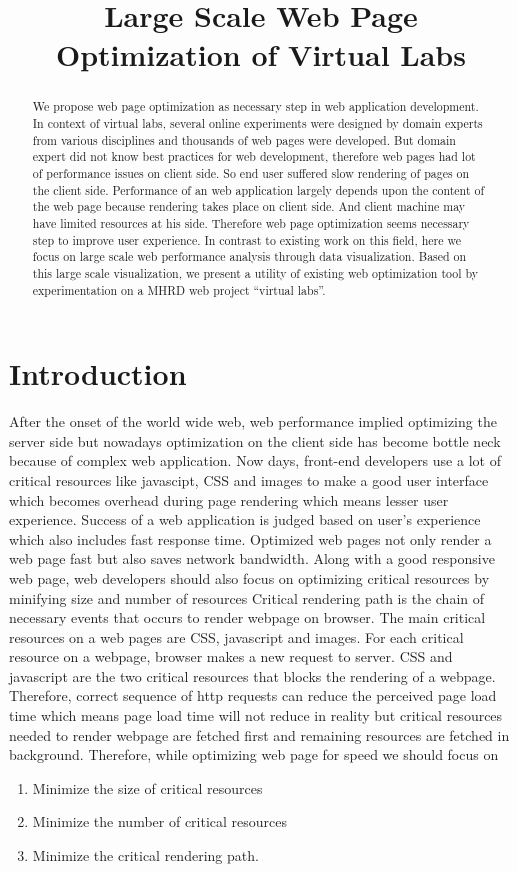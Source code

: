 \documentclass[conference]{IEEEtran}
\title{Large Scale Web Page Optimization of Virtual Labs}
\begin{document}
\maketitle

\begin{abstract}
We propose web page optimization as necessary step in web application
development. In context of virtual labs, several online experiments were designed by domain
experts from various disciplines and thousands of web pages were developed.
But domain expert did not know best practices for web development, therefore
web pages had lot of performance issues on client side. So end user suffered slow
rendering of pages on the client side.
Performance of an web application largely depends upon the content of the web
page because rendering takes place on client side. 
And client machine may have limited resources at his side. Therefore web page
optimization seems necessary step to improve user experience.
In contrast to existing work on this field, here we focus on large scale web
performance analysis through data visualization. Based on this large scale visualization,
we present a utility of existing web optimization tool by experimentation on a
MHRD web project ``virtual labs''.
\end{abstract}

\section{Introduction}\label{sec-2}
After the onset of the world wide web, web performance implied optimizing the server side but nowadays
optimization on the client side has become bottle neck because of complex web
application. Now days, front-end developers use a lot of critical resources like
javascipt, CSS and images to make a good user interface which becomes
overhead during page rendering which means lesser user experience. Success of a web
application is judged based on user's experience which also includes fast response
time. Optimized web pages not only render a web page fast but also saves network
bandwidth. Along with a good responsive web page, web developers should
also focus on optimizing critical resources by minifying size and number of resources
Critical rendering path is the chain of necessary events that
occurs to render webpage on browser. The main critical resources on a web
pages are CSS, javascript and images. For each critical resource on a
webpage, browser makes a new request to server. CSS and javascript are the two
critical resources that blocks the rendering of a webpage. Therefore, correct
sequence of http requests can reduce the perceived page load time which means page
load time will not reduce in reality but critical resources needed to render webpage are
fetched first and remaining resources are fetched in background. Therefore,
while optimizing web page for speed we should focus on \cite{crpo}
\begin{enumerate}
 \item Minimize the size of critical resources
 \item Minimize the number of critical resources
 \item Minimize the critical rendering path.
\end{enumerate}
\end{document}
